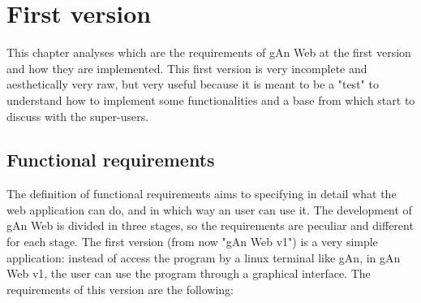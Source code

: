 
\chapter{First version} %

\label{Chapter3} %


This chapter analyses which are the requirements of gAn Web at the first version and how they are implemented. This first version is very incomplete and aesthetically very raw, but very useful because it is meant to be a "test" to understand how to implement some functionalities and a base from which start to discuss with the super-users. 

\section{Functional requirements}
The definition of functional requirements aims to specifying in detail what the web application can do, and in which way an user can use it. The development of gAn Web is divided in three stages, so the requirements are peculiar and different for each stage. The first version (from now "gAn Web v1") is a very simple application: instead of access the program by a linux terminal like gAn, in gAn Web v1, the user can use the program through a graphical interface. 
The requirements of this version are the following:

